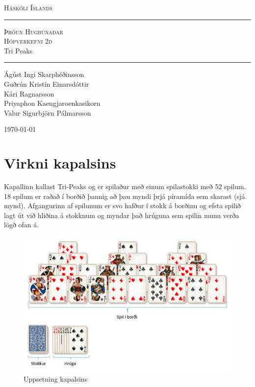 \documentclass[11pt,a4paper,titlepage]{article}
\theoremstyle{plain}
\theoremstyle{remark}
\begin{document}
\begin{center}


\textsc{Háskóli Íslands}
\end{center}
\vspace*{5cm}



\large {\bf
\begin{center}
\noindent\rule{15cm}{0.4pt}
\textsc{Þróun Hugbúnaðar}\\ \textsc{Hópverkefni 2d}\\ Tri Peaks \\
\noindent\rule{13cm}{0.4pt} \end{center}}
\small
\vspace{5cm}
\begin{center}
Ágúst Ingi Skarphéðinsson\\Guðrún Kristín Einarsdóttir\\Kári Ragnarsson\\Priyaphon Kaengjaroenkasikorn\\ Valur 
Sigurbjörn Pálmarsson
\end{center}
\vspace{5cm}
\begin{center}
\today
\end{center} 

\newpage \normalsize 
\newpage

\section{Virkni kapalsins}

Kapallinn kallast Tri-Peaks og er spilaður með einum spilastokki með 52 spilum. 18 spilum er raðað í borðið þannig að þau myndi þrjá píramída sem skarast (sjá mynd). Afgangurinn af spilunum er svo hafður í stokk á borðinu og efsta spilið lagt út við hliðina á stokknum og myndar það hrúguna sem spilin munu verða lögð ofan á.

\begin{figure}[H]
\centering
\includegraphics[scale=0.8]{uppstillingTriPeaks.png}
\caption{Uppsetning kapalsins}
\end{figure}
\end{document}
